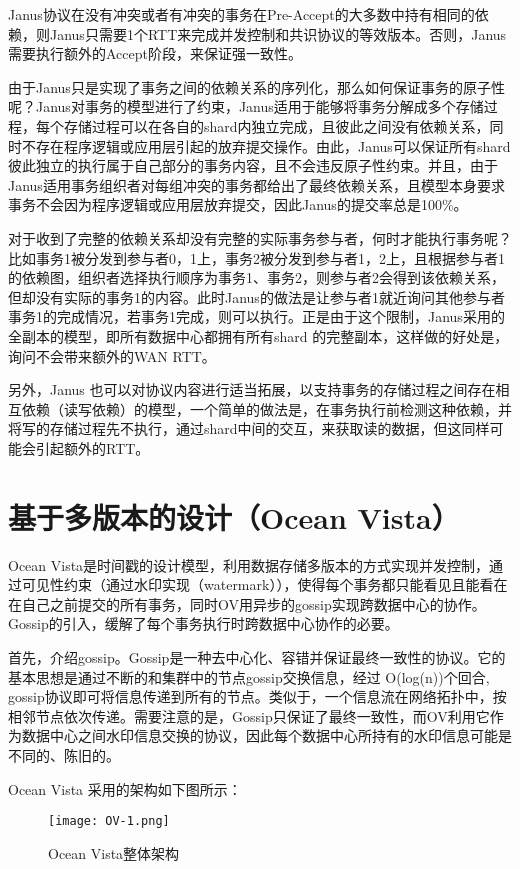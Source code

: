 Janus协议在没有冲突或者有冲突的事务在Pre-Accept的大多数中持有相同的依赖，则Janus只需要1个RTT来完成并发控制和共识协议的等效版本。否则，Janus需要执行额外的Accept阶段，来保证强一致性。

由于Janus只是实现了事务之间的依赖关系的序列化，那么如何保证事务的原子性呢？Janus对事务的模型进行了约束，Janus适用于能够将事务分解成多个存储过程，每个存储过程可以在各自的shard内独立完成，且彼此之间没有依赖关系，同时不存在程序逻辑或应用层引起的放弃提交操作。由此，Janus可以保证所有shard彼此独立的执行属于自己部分的事务内容，且不会违反原子性约束。并且，由于Janus适用事务组织者对每组冲突的事务都给出了最终依赖关系，且模型本身要求事务不会因为程序逻辑或应用层放弃提交，因此Janus的提交率总是100\%。

对于收到了完整的依赖关系却没有完整的实际事务参与者，何时才能执行事务呢？比如事务1被分发到参与者0，1上，事务2被分发到参与者1，2上，且根据参与者1的依赖图，组织者选择执行顺序为事务1、事务2，则参与者2会得到该依赖关系，但却没有实际的事务1的内容。此时Janus的做法是让参与者1就近询问其他参与者事务1的完成情况，若事务1完成，则可以执行。正是由于这个限制，Janus采用的全副本的模型，即所有数据中心都拥有所有shard 的完整副本，这样做的好处是，询问不会带来额外的WAN RTT。

另外，Janus 也可以对协议内容进行适当拓展，以支持事务的存储过程之间存在相互依赖（读写依赖）的模型，一个简单的做法是，在事务执行前检测这种依赖，并将写的存储过程先不执行，通过shard中间的交互，来获取读的数据，但这同样可能会引起额外的RTT。


\section{基于多版本的设计（Ocean Vista）}

Ocean Vista是时间戳的设计模型，利用数据存储多版本的方式实现并发控制，通过可见性约束（通过水印实现（watermark）），使得每个事务都只能看见且能看在在自己之前提交的所有事务，同时OV用异步的gossip实现跨数据中心的协作。Gossip的引入，缓解了每个事务执行时跨数据中心协作的必要。

首先，介绍gossip。Gossip是一种去中心化、容错并保证最终一致性的协议。它的基本思想是通过不断的和集群中的节点gossip交换信息，经过 O(log(n))个回合, gossip协议即可将信息传递到所有的节点。类似于，一个信息流在网络拓扑中，按相邻节点依次传递。需要注意的是，Gossip只保证了最终一致性，而OV利用它作为数据中心之间水印信息交换的协议，因此每个数据中心所持有的水印信息可能是不同的、陈旧的。

Ocean Vista 采用的架构如下图所示：

\begin{figure}[htb]
  \centering
  \texttt{[image: OV-1.png]}
  \caption{Ocean Vista整体架构}
  \label{fig:badge}
\end{figure}

